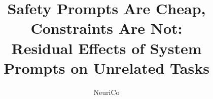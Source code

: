 \documentclass{article}
\title{Safety Prompts Are Cheap, Constraints Are Not:\\Residual Effects of System Prompts on Unrelated Tasks}
\author{NeuriCo}
\begin{document}
\maketitle

\begin{abstract}

\end{abstract}










\clearpage
\appendix

\end{document}
